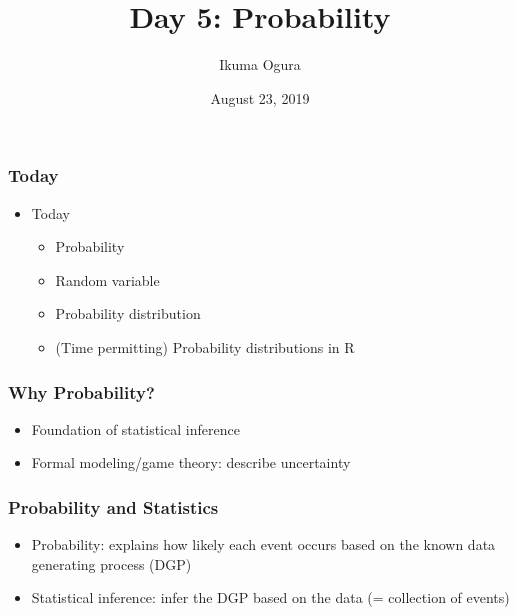 \documentclass[pdflatex, 12pt]{beamer}
\title[Math Camp: Day 5]{Day 5: Probability}
\author[Ikuma Ogura]{Ikuma Ogura}
\institute[Georgetown]{Ph.D. student, Department of Government, Georgetown University}
\date[August 23, 2019]{August 23, 2019}
\begin{document}
\begin{frame}
\frametitle{}
\titlepage
\end{frame}

\begin{frame}
\frametitle{Today}
\begin{itemize}
\item Today
 \begin{itemize}
 \item Probability
 \item Random variable
 \item Probability distribution
 \item (Time permitting) Probability distributions in R
 \end{itemize}
\end{itemize}
\end{frame}

\begin{frame}
\frametitle{Why Probability?}
\begin{itemize}
\item Foundation of statistical inference
\vspace{0.4cm}
\item Formal modeling/game theory: describe uncertainty
\end{itemize}
\end{frame}

\begin{frame}
\frametitle{Probability and Statistics}
\vspace{0.4cm}
\begin{itemize}
\item Probability: explains how likely each event occurs based on the known data generating process (DGP)
\vspace{0.4cm}
\item Statistical inference: infer the DGP based on the data (= collection of events)
\end{itemize}
\end{frame}
\end{document}

